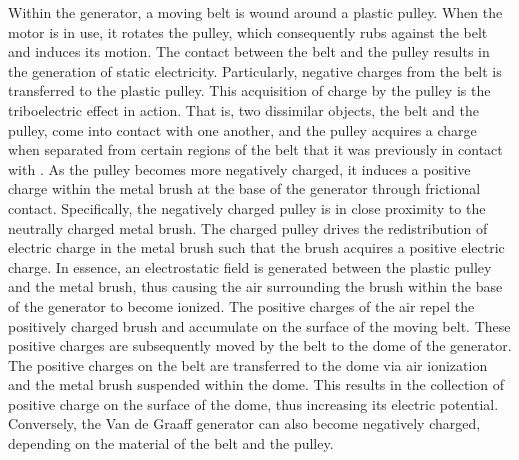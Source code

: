 \documentclass[12pt]{amsart}
\begin{document}
\indent Within the generator, a moving belt is wound around a plastic pulley. When the motor is in use, it rotates the pulley, which consequently rubs against the belt and induces its motion. The contact between the belt and the pulley results in the generation of static electricity. Particularly, negative charges from the belt is transferred to the plastic pulley.  This acquisition of charge by the pulley is the triboelectric effect in action. That is, two dissimilar objects, the belt and the pulley, come into contact with one another, and the pulley acquires a charge when separated from certain regions of the belt that it was previously in contact with \cite{Vander:2}. As the pulley becomes more negatively charged, it induces a positive charge within the metal brush at the base of the generator through frictional contact. Specifically, the negatively charged pulley is in close proximity to the neutrally charged metal brush. The charged pulley drives the redistribution of electric charge in the metal brush such that the brush acquires a positive electric charge. In essence, an electrostatic field is generated between the plastic pulley and the metal brush, thus causing the air surrounding the brush within the base of the generator to become ionized. The positive charges of the air repel the positively charged brush and accumulate on the surface of the moving belt. These positive charges are subsequently moved by the belt to the dome of the generator. The positive charges on the belt are transferred to the dome via air ionization and the metal brush suspended within the dome. This results in the collection of  positive charge on the surface of the dome, thus increasing its electric potential. Conversely, the Van de Graaff generator can also become negatively charged, depending on the material of the belt and the pulley.\\
\end{document}
